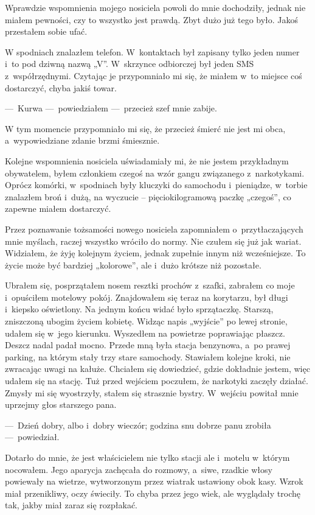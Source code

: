 Wprawdzie wspomnienia mojego nosiciela powoli do mnie dochodziły, jednak nie miałem pewności, czy to wszystko jest prawdą. Zbyt dużo już tego było. Jakoś przestałem sobie ufać.
 
W spodniach znalazłem telefon. W~kontaktach był zapisany tylko jeden numer i~to pod dziwną nazwą „V”. W~skrzynce odbiorczej był jeden SMS z~współrzędnymi. Czytając je przypomniało mi się, że miałem w~to miejsce coś dostarczyć, chyba jakiś towar.

---~Kurwa ---~powiedziałem ---~przecież szef mnie zabije. 

W tym momencie przypomniało mi się, że przecież śmierć nie jest mi obca, a~wypowiedziane zdanie brzmi śmiesznie.

Kolejne wspomnienia nosiciela uświadamiały mi, że nie jestem przykładnym obywatelem, byłem członkiem czegoś na wzór gangu związanego z~narkotykami. Oprócz komórki, w~spodniach były kluczyki do samochodu i~pieniądze, w~torbie znalazłem broń i~dużą, na wyczucie -- pięciokilogramową paczkę „czegoś”, co zapewne miałem dostarczyć. 

Przez poznawanie tożsamości nowego nosiciela zapomniałem o~przytłaczających mnie myślach, raczej wszystko wróciło do normy. Nie czułem się już jak wariat. Widziałem, że żyję kolejnym życiem, jednak zupełnie innym niż wcześniejsze. To życie może być bardziej „kolorowe”, ale i~dużo krótsze niż pozostałe.
 
Ubrałem się, posprzątałem nosem resztki prochów z~szafki, zabrałem co moje i~opuściłem motelowy pokój. Znajdowałem się teraz na korytarzu, był długi i~kiepsko oświetlony. Na jednym końcu widać było sprzątaczkę. Starszą, zniszczoną ubogim życiem kobietę. Widząc napis „wyjście” po lewej stronie, udałem się w~jego kierunku. Wyszedłem na powietrze poprawiając płaszcz. Deszcz nadal padał mocno. Przede mną była stacja benzynowa, a~po prawej parking, na którym stały trzy stare samochody. Stawiałem kolejne kroki, nie zwracając uwagi na kałuże. Chciałem się dowiedzieć, gdzie dokładnie jestem, więc udałem się na stację. Tuż przed wejściem poczułem, że narkotyki zaczęły działać. Zmysły mi się wyostrzyły, stałem się strasznie bystry. W~wejściu powitał mnie uprzejmy głos starszego pana.

---~Dzień dobry, albo i~dobry wieczór; godzina snu dobrze panu zrobiła ---~powiedział.
 
Dotarło do mnie, że jest właścicielem nie tylko stacji ale i~motelu w~którym nocowałem. Jego aparycja zachęcała do rozmowy, a~siwe, rzadkie włosy powiewały na wietrze, wytworzonym przez wiatrak ustawiony obok kasy. Wzrok miał przenikliwy, oczy świeciły. To chyba przez jego wiek, ale wyglądały trochę tak, jakby miał zaraz się rozpłakać.

